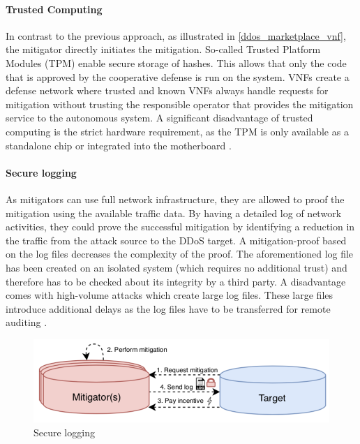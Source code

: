 \paragraph{Trusted Computing}
In contrast to the previous approach, as illustrated in \ref{ddos_marketplace_vnf}, the mitigator directly initiates the mitigation. So-called Trusted Platform Modules (TPM) enable secure storage of hashes. This allows that only the code that is approved by the cooperative defense is run on the system. VNFs create a defense network where trusted and known VNFs always handle requests for mitigation without trusting the responsible operator that provides the mitigation service to the autonomous system.  A significant disadvantage of trusted computing is the strict hardware requirement, as the TPM is only available as a standalone chip or integrated into the motherboard \cite{Mannhart2018}.

\paragraph{Secure logging}
As mitigators can use full network infrastructure, they are allowed to proof the mitigation using the available traffic data. By having a detailed log of network activities, they could prove the successful mitigation by identifying a reduction in the traffic from the attack source to the DDoS target. A mitigation-proof based on the log files decreases the complexity of the proof. The aforementioned log file has been created on an isolated system (which requires no additional trust) and therefore has to be checked about its integrity by a third party. A disadvantage comes with high-volume attacks which create large log files. These large files introduce additional delays as the log files have to be transferred for remote auditing \cite{Mannhart2018}.
\begin{figure}[ht]
  \begin{center}
    \includegraphics[scale=0.5]{Talk7/img/ddos/cooperative_network_secure_logging}
  \end{center}
  \caption{Secure logging}
  \label{ddos_secure_logging}
\end{figure}

